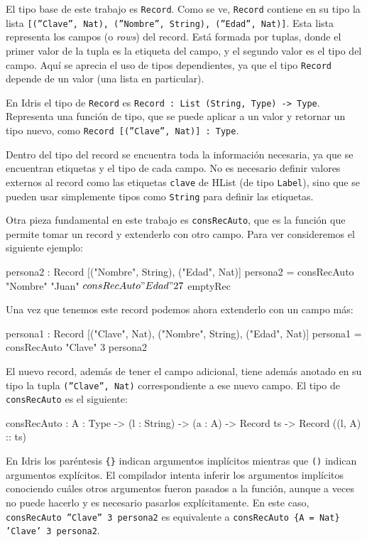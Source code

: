 El tipo base de este trabajo es \texttt{Record}. Como se ve, \texttt{Record} contiene en su tipo la lista \texttt{[(''Clave'', Nat), (''Nombre'', String), (''Edad'', Nat)]}. Esta lista representa los campos (o \textit{rows}) del record. Está formada por tuplas, donde el primer valor de la tupla es la etiqueta del campo, y el segundo valor es el tipo del campo. Aquí se aprecia el uso de tipos dependientes, ya que el tipo \texttt{Record} depende de un valor (una lista en particular).

En Idris el tipo de \texttt{Record} es \texttt{Record : List (String, Type) -> Type}. Representa una función de tipo, que se puede aplicar a un valor y retornar un tipo nuevo, como \texttt{Record [(''Clave'', Nat)] : Type}.

Dentro del tipo del record se encuentra toda la información necesaria, ya que se encuentran etiquetas y el tipo de cada campo. No es necesario definir valores externos al record como las etiquetas \texttt{clave} de HList (de tipo \texttt{Label}), sino que se pueden usar simplemente tipos como \texttt{String} para definir las etiquetas.

Otra pieza fundamental en este trabajo es \texttt{consRecAuto}, que es la función que permite tomar un record y extenderlo con otro campo. Para ver consideremos el siguiente ejemplo:

\begin{code}
persona2 : Record [("Nombre", String), ("Edad", Nat)]
persona2 = consRecAuto "Nombre" "Juan" $
  consRecAuto "Edad" 27 $
  emptyRec
\end{code}

Una vez que tenemos este record podemos ahora extenderlo con un campo más:

\begin{code}
persona1 : Record [("Clave", Nat), ("Nombre", String),
  ("Edad", Nat)]
persona1 = consRecAuto "Clave" 3 persona2
\end{code}

El nuevo record, además de tener el campo adicional, tiene además anotado en su tipo la tupla \texttt{(''Clave'', Nat)} correspondiente a ese nuevo campo. El tipo de \texttt{consRecAuto} es el siguiente:

\begin{code}
consRecAuto : {A : Type} -> (l : String) -> (a : A) ->
  Record ts -> Record ((l, A) :: ts)
\end{code}

En Idris los paréntesis \texttt{\{\}} indican argumentos implícitos mientras que \texttt{()} indican argumentos explícitos. El compilador intenta inferir los argumentos implícitos conociendo cuáles otros argumentos fueron pasados a la función, aunque a veces no puede hacerlo y es necesario pasarlos explícitamente. En este caso, \texttt{consRecAuto ''Clave'' 3 persona2} es equivalente a \texttt{consRecAuto \{A = Nat\} 'Clave' 3 persona2}.

